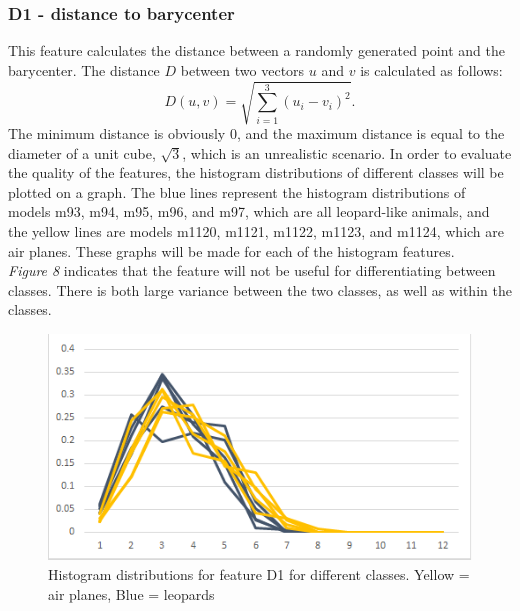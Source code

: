 \documentclass{bigdata}
\begin{document}
\subsubsection{D1 - distance to barycenter}
This feature calculates the distance between a randomly generated point and the barycenter. The distance $D$ between two vectors $u$ and $v$ is calculated as follows:
\begin{equation}
D(u,v) = \sqrt{\sum\limits_{i=1}^3 (u_i - v_i)^2}.
\end{equation}
The minimum distance is obviously 0, and the maximum distance is equal to the diameter of a unit cube, $\sqrt{3}$, which is an unrealistic scenario. In order to evaluate the quality of the features, the histogram distributions of different classes will be plotted on a graph. The blue lines represent the histogram distributions of models m93, m94, m95, m96, and m97, which are all leopard-like animals, and the yellow lines are models m1120, m1121, m1122, m1123, and m1124, which are air planes. These graphs will be made for each of the histogram features.\\
 \textit{Figure 8} indicates that the feature will not be useful for differentiating between classes. There is both large variance between the two classes, as well as within the classes.

\begin{figure}[h!]
	\begin{center}
    \includegraphics[width=0.7\linewidth]{Pictures/Part3/D1.png}
    \caption{Histogram distributions for feature D1 for different classes. Yellow = air planes, Blue = leopards}
  \label{fig:eccentricity}
  	\end{center}
\end{figure}
\end{document}
